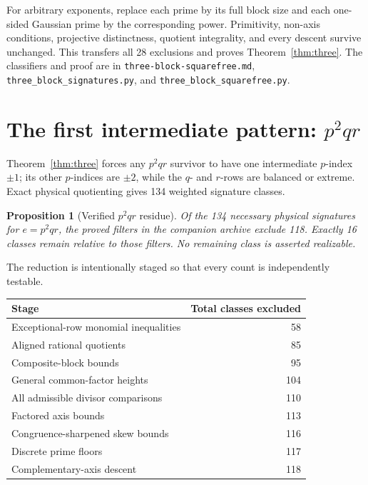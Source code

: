 \documentclass[11pt]{article}
\newtheorem{proposition}[theorem]{Proposition}
\theoremstyle{definition}
\theoremstyle{remark}
\begin{document}
For arbitrary exponents, replace each prime by its full block size and each
one-sided Gaussian prime by the corresponding power.  Primitivity,
non-axis conditions, projective distinctness, quotient integrality, and every
descent survive unchanged.  This transfers all 28 exclusions and proves
Theorem~\ref{thm:three}.  The classifiers and proof are in
\texttt{three-block-squarefree.md},
\texttt{three\_block\_signatures.py}, and
\texttt{three\_block\_squarefree.py}.

\section{The first intermediate pattern: $p^2qr$}

Theorem~\ref{thm:three} forces any $p^2qr$ survivor to have one intermediate
$p$-index $\pm1$; its other $p$-indices are $\pm2$, while the $q$- and
$r$-rows are balanced or extreme.  Exact physical quotienting gives 134
weighted signature classes.

\begin{proposition}[Verified $p^2qr$ residue]
\label{prop:p2qr}
Of the 134 necessary physical signatures for $e=p^2qr$, the proved filters in
the companion archive exclude 118.  Exactly 16 classes remain relative to
those filters.  No remaining class is asserted realizable.
\end{proposition}

The reduction is intentionally staged so that every count is independently
testable.
\begin{center}
\begin{tabular}{@{}lr@{}}
\toprule
Stage & Total classes excluded \\
\midrule
Exceptional-row monomial inequalities & 58 \\
Aligned rational quotients & 85 \\
Composite-block bounds & 95 \\
General common-factor heights & 104 \\
All admissible divisor comparisons & 110 \\
Factored axis bounds & 113 \\
Congruence-sharpened skew bounds & 116 \\
Discrete prime floors & 117 \\
Complementary-axis descent & 118 \\
\bottomrule
\end{tabular}
\end{center}
\end{document}
